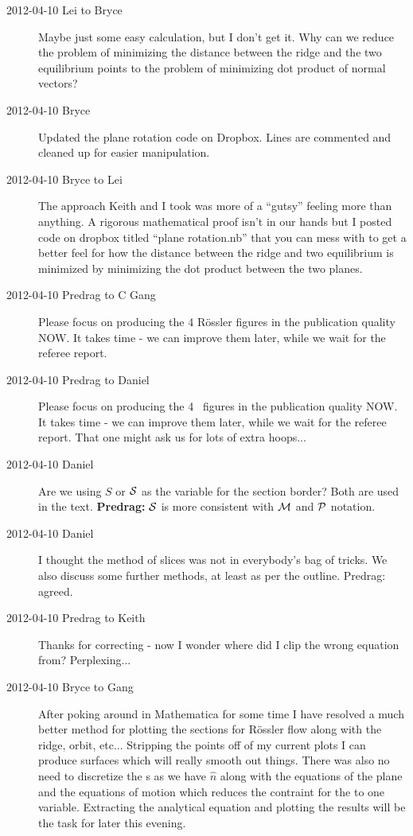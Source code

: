 \begin{description}
\item[2012-04-10 Lei to Bryce] Maybe just some easy calculation, but I
don't get it. Why can we reduce the problem of minimizing the distance
between the ridge and the two equilibrium points to the problem of
minimizing dot product of normal vectors?

\item[2012-04-10 Bryce] Updated the plane rotation code on Dropbox. Lines
are commented and cleaned up for easier manipulation.

\item[2012-04-10 Bryce to Lei] The approach Keith and I took was more of
a ``gutsy'' feeling more than anything. A rigorous mathematical proof
isn't in our hands but I posted code on dropbox titled ``plane
rotation.nb'' that you can mess with to get a better feel for how the
distance between the ridge and two equilibrium is minimized by minimizing
the dot product between the two planes.

\item[2012-04-10 Predrag to C Gang]
Please focus on producing the 4 R\"ossler figures in the publication quality NOW.
It takes time - we can improve them later, while we wait for the referee report.

\item[2012-04-10 Predrag to Daniel]
Please focus on producing the 4 \cLe\ figures in the publication quality NOW.
It takes time - we can improve them later, while we wait for the referee report.
That one might ask us for lots of extra hoops...

\item[2012-04-10 Daniel] Are we using $S$ or ${\cal S}$ as the variable
for the section border? Both are used in the text.
{\bf Predrag:} ${\cal S}$ is more consistent with ${\cal M}$ and ${\cal P}$
notation.

\item[2012-04-10 Daniel] I thought the method of slices was not in
everybody's bag of tricks. We also discuss some further methods, at least
as per the outline. Predrag: agreed.

\item[2012-04-10 Predrag to Keith] Thanks for correcting
 - now I wonder where did I clip the wrong equation
from? Perplexing...

\item[2012-04-10 Bryce to Gang] After poking around in Mathematica for
some time I have resolved a much better method for plotting the sections
for R\"ossler flow along with the ridge, orbit, etc... Stripping the
points off of my current plots I can produce surfaces which will really
smooth out things. There was also no need to discretize the {\poincBord
s} as we have $\hat{n}$ along with the equations of the plane and the
equations of motion which reduces the contraint for the {\poincBord} to
one variable. Extracting the analytical equation and plotting the results
will be the task for later this evening.


\end{description}
